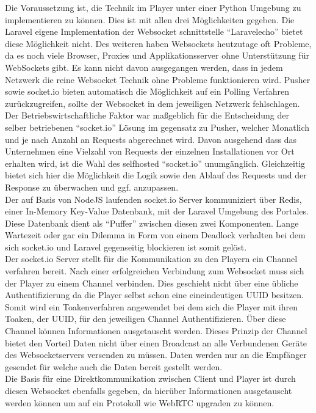 Die Voraussetzung ist, die Technik im Player unter einer Python Umgebung zu implementieren zu können. Dies ist mit allen drei Möglichkeiten gegeben. Die Laravel eigene Implementation der Websocket schnittstelle "`Laravelecho"' bietet diese Möglichkeit nicht. Des weiteren haben Websockets heutzutage oft Probleme, da es noch viele Browser, Proxies und Applikationsserver ohne Unterstützung für WebSockets gibt. Es kann nicht davon ausgegangen werden, dass in jedem Netzwerk die reine Websocket Technik ohne Probleme funktionieren wird. Pusher sowie socket.io bieten automatisch die Möglichkeit auf ein Polling Verfahren zurückzugreifen, sollte der Websocket in dem jeweiligen Netzwerk fehlschlagen. \\Der Betriebswirtschaftliche Faktor war maßgeblich für die Entscheidung der selber betriebenen "`socket.io"' Lösung im gegensatz zu Pusher, welcher Monatlich und je nach Anzahl an Requests abgerechnet wird. Davon ausgehend dass das Unternehmen eine Vielzahl von Requests der einzelnen Installationen vor Ort erhalten wird, ist die Wahl des selfhosted "`socket.io"' unumgänglich. Gleichzeitig bietet sich hier die Möglichkeit die Logik sowie den Ablauf des Requests und der Response zu überwachen und ggf. anzupassen.
\bigskip \\Der auf Basis von NodeJS laufenden socket.io Server kommuniziert über Redis, einer In-Memory Key-Value Datenbank, mit der Laravel Umgebung des Portales. Diese Datenbank dient als "`Puffer"' zwischen diesen zwei Komponenten. Lange Wartezeit oder gar ein Dilemma in Form von einem Deadlock verhalten bei dem sich socket.io und Laravel gegenseitig blockieren ist somit gelöst.
\\Der socket.io Server stellt für die Kommunikation zu den Playern ein Channel verfahren bereit. Nach einer erfolgreichen Verbindung zum Websocket muss sich der Player zu einem Channel verbinden. Dies geschieht nicht über eine übliche Authentifizierung da die Player selbst schon eine eineindeutigen UUID besitzen. Somit wird ein Toakenverfahren angewendet bei dem sich die Player mit ihren Toaken, der UUID, für den jeweiligen Channel Authentifizieren. Über diese Channel können Informationen ausgetauscht werden. Dieses Prinzip der Channel bietet den Vorteil Daten nicht über einen Broadcast an alle Verbundenen Geräte des Websocketservers versenden zu müssen. Daten werden nur an die Empfänger gesendet für welche auch die Daten bereit gestellt werden.
\bigskip\\Die Basis für eine Direktkommunikation zwischen Client und Player ist durch diesen Websocket ebenfalls gegeben, da hierüber Informationen ausgetauscht werden können um auf ein Protokoll wie WebRTC upgraden zu können.

